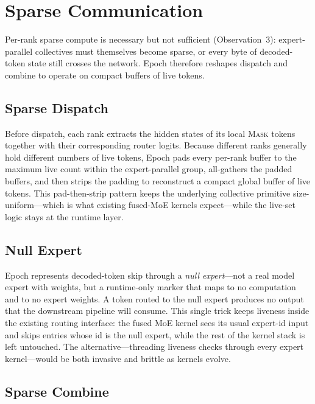 \documentclass[sigconf,review,anonymous, 10pt]{acmart}
\newcommand{\sys}{Epoch}
\newcommand{\mask}{\textsc{Mask}}
\begin{document}
\section{Sparse Communication}
\label{sec:sparse-comm}

Per-rank sparse compute is necessary but not sufficient (Observation~3): expert-parallel collectives must themselves become sparse, or every byte of decoded-token state still crosses the network.
\sys{} therefore reshapes dispatch and combine to operate on compact buffers of live tokens.

\subsection{Sparse Dispatch}

Before dispatch, each rank extracts the hidden states of its local \mask{} tokens together with their corresponding router logits.
Because different ranks generally hold different numbers of live tokens, \sys{} pads every per-rank buffer to the maximum live count within the expert-parallel group, all-gathers the padded buffers, and then strips the padding to reconstruct a compact global buffer of live tokens.
This pad-then-strip pattern keeps the underlying collective primitive size-uniform---which is what existing fused-MoE kernels expect---while the live-set logic stays at the runtime layer.

\subsection{Null Expert}

\sys{} represents decoded-token skip through a \emph{null expert}---not a real model expert with weights, but a runtime-only marker that maps to no computation and to no expert weights.
A token routed to the null expert produces no output that the downstream pipeline will consume.
This single trick keeps liveness inside the existing routing interface: the fused MoE kernel sees its usual expert-id input and skips entries whose id is the null expert, while the rest of the kernel stack is left untouched.
The alternative---threading liveness checks through every expert kernel---would be both invasive and brittle as kernels evolve.

\subsection{Sparse Combine}
\end{document}

